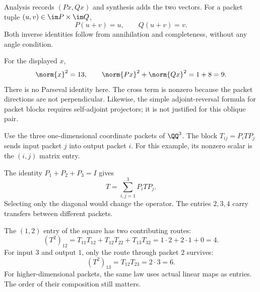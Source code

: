 
Analysis records $(Px,Qx)$ and synthesis adds the two vectors. For a packet tuple $(u,v)\in\im P\times\im Q$,
\[
P(u+v)=u,\qquad Q(u+v)=v.
\]
Both inverse identities follow from annihilation and completeness, without any angle condition.

For the displayed $x$,
\[
\norm{x}^2=13,\qquad \norm{Px}^2+\norm{Qx}^2=1+8=9.
\]
There is no Parseval identity here. The cross term is nonzero because the packet directions are not perpendicular. Likewise, the simple adjoint-reversal formula for packet blocks requires self-adjoint projectors; it is not justified for this oblique pair.


Use the three one-dimensional coordinate packets of $\QQ^3$. The block $T_{ij}=P_iTP_j$ sends input packet $j$ into output packet $i$. For this example, its nonzero scalar is the $(i,j)$ matrix entry.


The identity $P_1+P_2+P_3=I$ gives
\[
T=\sum_{i,j=1}^3 P_iTP_j.
\]
Selecting only the diagonal would change the operator. The entries $2,3,4$ carry transfers between different packets.

The $(1,2)$ entry of the square has two contributing routes:
\[
(T^2)_{12}=T_{11}T_{12}+T_{12}T_{22}+T_{13}T_{32}
=1\cdot2+2\cdot1+0=4.
\]
For input $3$ and output $1$, only the route through packet $2$ survives:
\[
(T^2)_{13}=T_{12}T_{23}=2\cdot3=6.
\]
For higher-dimensional packets, the same law uses actual linear maps as entries. The order of their composition still matters.


